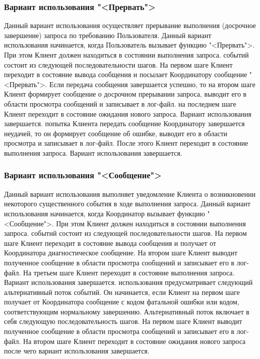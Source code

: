 \documentclass[11pt,oneside]{article}
\begin{document}
	\subsubsection{Вариант использования "<Прервать">}
	Данный вариант использования осуществляет прерывание выполнения (досрочное завершение) запроса по требованию Пользователя. Данный вариант использования начинается, когда Пользователь вызывает функцию "<Прервать">. При этом Клиент должен находиться в состоянии выполнения запроса.
	 событий состоит из следующей последовательности шагов. На первом шаге Клиент переходит в состояние вывода сообщения и посылает Координатору сообщение "<Прервать">. Если передача сообщения завершается успешно, то на втором шаге Клиент формирует сообщение о досрочном прерывании запроса, выводит его в области просмотра сообщений и записывает в лог-файл. на последнем шаге Клиент переходит в состояние ожидания нового запроса. Вариант использования завершается.
	 попытка Клиента передать сообщение Координатору завершается неудачей, то он формирует сообщение об ошибке, выводит его в области просмотра и записывает в лог-файл. После этого Клиент переходит в состояние выполнения запроса. Вариант использования завершается.
	
	\subsubsection{Вариант использования "<Сообщение">}
	Данный вариант использования выполняет уведомление Клиента о возникновении некоторого существенного события в ходе выполнения запроса. Данный вариант использования начинается, когда Координатор вызывает функцию "<Сообщение">. При этом Клиент должен находиться в состоянии выполнения запроса.
	 событий состоит из следующей последовательности шагов. На первом шаге Клиент переходит в состояние вывода сообщения и получает от Координатора диагностическое сообщение. На втором шаге Клиент выводит полученное сообщение в области просмотра сообщений и записывает его в лог-файл. На третьем шаге Клиент переходит в состояние выполнения запроса. Вариант использования завершается.
	 использования предусматривает следующий альтернативный поток событий. Он начинается, если Клиент на первом шаге получает от Координатора сообщение с кодом фатальной ошибки или кодом, соответствующим нормальному завершению. Альтернативный поток включает в себя следующую последовательность шагов. На первом шаге Клиент выводит полученное сообщение в области просмотра сообщений и записывает его в лог-файл. На втором шаге Клиент переходит в состояние ожидания нового запроса после чего вариант использования завершается.
	
\end{document}
